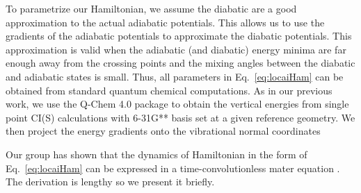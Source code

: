 To parametrize our Hamiltonian, we assume the diabatic
are a good approximation to the actual adiabatic potentials.
This allows us to
use the gradients of the adiabatic potentials to approximate the diabatic potentials.
This approximation is  valid when the adiabatic (and diabatic) energy minima
are far enough away from the crossing points and the mixing angles between the diabatic  and adiabatic
states is small.
Thus, all parameters in Eq.~\ref{eq:locaiHam}  can be  obtained from
standard  quantum chemical computations.
As in our previous work, we use the Q-Chem 4.0 package  to obtain the vertical energies
 from single point CI(S) calculations with 6-31G** basis set at a given
reference geometry.   We then project the energy gradients onto the vibrational normal
coordinates

Our group has shown that the dynamics of Hamiltonian in the form of Eq.~\ref{eq:locaiHam} can be expressed in a time-convolutionless mater equation \cite{pereverzev2006time}. The derivation is lengthy so we present it briefly.

